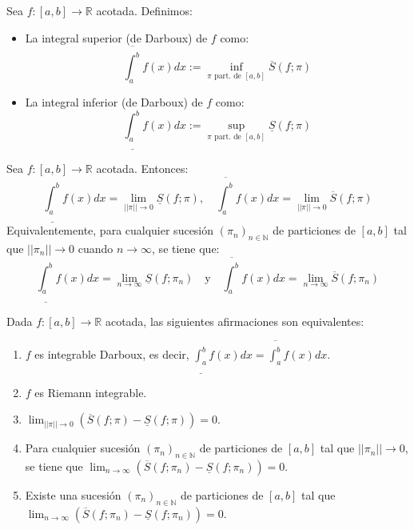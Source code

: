 \documentclass[11pt]{article}
\begin{document}
\begin{definition}
Sea $f:[a,b] \rightarrow \mathbb{R}$ acotada. Definimos:
\begin{itemize}
    \item La integral superior (de Darboux) de $f$ como:
    $$ \overline{\int_{a}^{b}} f(x)dx := \inf_{\pi \text{ part. de } [a,b]} \overline{S}(f; \pi) $$
    \item La integral inferior (de Darboux) de $f$ como:
    $$ \underline{\int_{a}^{b}} f(x)dx := \sup_{\pi \text{ part. de } [a,b]} \underline{S}(f; \pi) $$
\end{itemize}
\end{definition}

\begin{theorem}
Sea $f:[a,b] \rightarrow \mathbb{R}$ acotada. Entonces:
$$ \underline{\int_{a}^{b}} f(x)dx = \lim_{||\pi|| \rightarrow 0} \underline{S}(f; \pi), \quad \overline{\int_{a}^{b}} f(x)dx = \lim_{||\pi|| \rightarrow 0} \overline{S}(f; \pi) $$
Equivalentemente, para cualquier sucesión $(\pi_n)_{n \in \mathbb{N}}$ de particiones de $[a,b]$ tal que $||\pi_n|| \rightarrow 0$ cuando $n \rightarrow \infty$, se tiene que:
$$ \underline{\int_{a}^{b}} f(x)dx = \lim_{n \rightarrow \infty} \underline{S}(f; \pi_n) \quad \text{y} \quad \overline{\int_{a}^{b}} f(x)dx = \lim_{n \rightarrow \infty} \overline{S}(f; \pi_n) $$
\end{theorem}

\begin{theorem}
Dada $f:[a,b] \rightarrow \mathbb{R}$ acotada, las siguientes afirmaciones son equivalentes:
\begin{enumerate}
    \item $f$ es integrable Darboux, es decir, $\underline{\int_{a}^{b}} f(x)dx = \overline{\int_{a}^{b}} f(x)dx$.
    \item $f$ es Riemann integrable.
    \item $\lim_{||\pi|| \rightarrow 0} (\overline{S}(f; \pi) - \underline{S}(f; \pi)) = 0$.
    \item Para cualquier sucesión $(\pi_n)_{n \in \mathbb{N}}$ de particiones de $[a,b]$ tal que $||\pi_n|| \rightarrow 0$, se tiene que $\lim_{n \rightarrow \infty} (\overline{S}(f; \pi_n) - \underline{S}(f; \pi_n)) = 0$.
    \item Existe una sucesión $(\pi_n)_{n \in \mathbb{N}}$ de particiones de $[a,b]$ tal que $\lim_{n \rightarrow \infty} (\overline{S}(f; \pi_n) - \underline{S}(f; \pi_n)) = 0$.
\end{enumerate}
\end{theorem}
\end{document}
